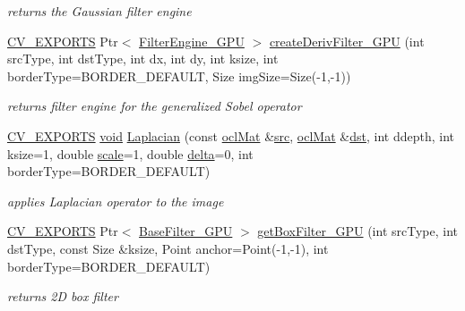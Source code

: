 \begin{DoxyCompactItemize}
\begin{DoxyCompactList}\small\item\em returns the Gaussian filter engine \end{DoxyCompactList}\item 
\hyperlink{core_2types__c_8h_a1bf9f0e121b54272da02379cfccd0a2b}{C\-V\-\_\-\-E\-X\-P\-O\-R\-T\-S} Ptr$<$ \hyperlink{classcv_1_1ocl_1_1FilterEngine__GPU}{Filter\-Engine\-\_\-\-G\-P\-U} $>$ \hyperlink{namespacecv_1_1ocl_a339729650f2176f02488d03fe07f7bd7}{create\-Deriv\-Filter\-\_\-\-G\-P\-U} (int src\-Type, int dst\-Type, int dx, int dy, int ksize, int border\-Type=B\-O\-R\-D\-E\-R\-\_\-\-D\-E\-F\-A\-U\-L\-T, Size img\-Size=Size(-\/1,-\/1))
\begin{DoxyCompactList}\small\item\em returns filter engine for the generalized Sobel operator \end{DoxyCompactList}\item 
\hyperlink{core_2types__c_8h_a1bf9f0e121b54272da02379cfccd0a2b}{C\-V\-\_\-\-E\-X\-P\-O\-R\-T\-S} \hyperlink{legacy_8hpp_a8bb47f092d473522721002c86c13b94e}{void} \hyperlink{namespacecv_1_1ocl_aa31e00f70d70d7836c29aad7409a4ea1}{Laplacian} (const \hyperlink{classcv_1_1ocl_1_1oclMat}{ocl\-Mat} \&\hyperlink{legacy_8hpp_a371cd109b74033bc4366f584edd3dacc}{src}, \hyperlink{classcv_1_1ocl_1_1oclMat}{ocl\-Mat} \&\hyperlink{photo__c_8h_aed13e2a25279b24dc954073233fef7a5}{dst}, int ddepth, int ksize=1, double \hyperlink{objdetect_8hpp_a1f622eb9b9e06b30862ca90cdf2c078b}{scale}=1, double \hyperlink{legacy_8hpp_ac867054f00f4be8b1f3ebce6fba31982}{delta}=0, int border\-Type=B\-O\-R\-D\-E\-R\-\_\-\-D\-E\-F\-A\-U\-L\-T)
\begin{DoxyCompactList}\small\item\em applies Laplacian operator to the image \end{DoxyCompactList}\item 
\hyperlink{core_2types__c_8h_a1bf9f0e121b54272da02379cfccd0a2b}{C\-V\-\_\-\-E\-X\-P\-O\-R\-T\-S} Ptr$<$ \hyperlink{classcv_1_1ocl_1_1BaseFilter__GPU}{Base\-Filter\-\_\-\-G\-P\-U} $>$ \hyperlink{namespacecv_1_1ocl_a3eb24df962062d934fefed994c45ca48}{get\-Box\-Filter\-\_\-\-G\-P\-U} (int src\-Type, int dst\-Type, const Size \&ksize, Point anchor=Point(-\/1,-\/1), int border\-Type=B\-O\-R\-D\-E\-R\-\_\-\-D\-E\-F\-A\-U\-L\-T)
\begin{DoxyCompactList}\small\item\em returns 2\-D box filter \end{DoxyCompactList}\item 

\end{DoxyCompactItemize}

